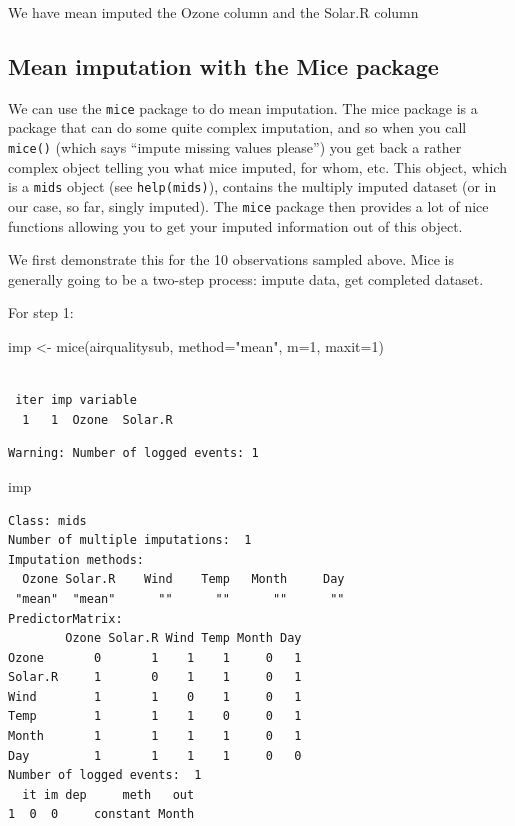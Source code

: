 \documentclass[
  letterpaper,
  DIV=11,
  numbers=noendperiod]{scrreprt}
\newenvironment{Shaded}{\begin{snugshade}}{\end{snugshade}}
\newcommand{\AttributeTok}[1]{\textcolor[rgb]{0.49,0.56,0.16}{#1}}
\newcommand{\DecValTok}[1]{\textcolor[rgb]{0.25,0.63,0.44}{#1}}
\newcommand{\FunctionTok}[1]{\textcolor[rgb]{0.02,0.16,0.49}{#1}}
\newcommand{\NormalTok}[1]{\textcolor[rgb]{0.00,0.44,0.13}{#1}}
\newcommand{\OtherTok}[1]{\textcolor[rgb]{0.00,0.44,0.13}{#1}}
\newcommand{\StringTok}[1]{\textcolor[rgb]{0.25,0.44,0.63}{#1}}
\begin{document}
We have mean imputed the Ozone column and the Solar.R column

\hypertarget{mean-imputation-with-the-mice-package}{%
\subsection{Mean imputation with the Mice
package}\label{mean-imputation-with-the-mice-package}}

We can use the \texttt{mice} package to do mean imputation. The mice
package is a package that can do some quite complex imputation, and so
when you call \texttt{mice()} (which says ``impute missing values
please'') you get back a rather complex object telling you what mice
imputed, for whom, etc. This object, which is a \texttt{mids} object
(see \texttt{help(mids)}), contains the multiply imputed dataset (or in
our case, so far, singly imputed). The \texttt{mice} package then
provides a lot of nice functions allowing you to get your imputed
information out of this object.

We first demonstrate this for the 10 observations sampled above. Mice is
generally going to be a two-step process: impute data, get completed
dataset.

For step 1:

\begin{Shaded}
\begin{Highlighting}[]
\NormalTok{  imp }\OtherTok{\textless{}{-}} \FunctionTok{mice}\NormalTok{(airqualitysub, }\AttributeTok{method=}\StringTok{"mean"}\NormalTok{, }\AttributeTok{m=}\DecValTok{1}\NormalTok{, }\AttributeTok{maxit=}\DecValTok{1}\NormalTok{)}
\end{Highlighting}
\end{Shaded}

\begin{verbatim}

 iter imp variable
  1   1  Ozone  Solar.R
\end{verbatim}

\begin{verbatim}
Warning: Number of logged events: 1
\end{verbatim}

\begin{Shaded}
\begin{Highlighting}[]
\NormalTok{  imp}
\end{Highlighting}
\end{Shaded}

\begin{verbatim}
Class: mids
Number of multiple imputations:  1 
Imputation methods:
  Ozone Solar.R    Wind    Temp   Month     Day 
 "mean"  "mean"      ""      ""      ""      "" 
PredictorMatrix:
        Ozone Solar.R Wind Temp Month Day
Ozone       0       1    1    1     0   1
Solar.R     1       0    1    1     0   1
Wind        1       1    0    1     0   1
Temp        1       1    1    0     0   1
Month       1       1    1    1     0   1
Day         1       1    1    1     0   0
Number of logged events:  1 
  it im dep     meth   out
1  0  0     constant Month
\end{verbatim}
\end{document}
